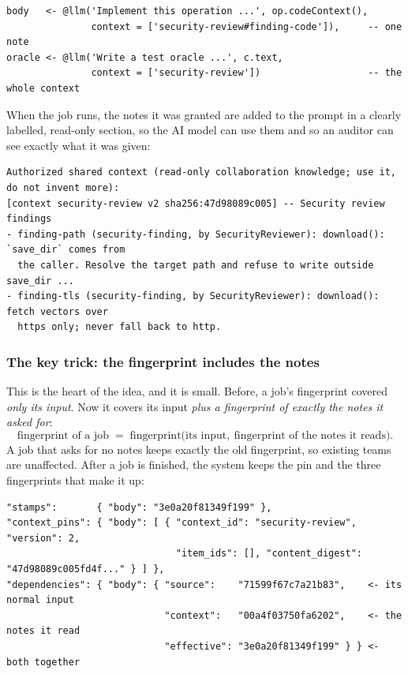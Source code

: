 \documentclass[10pt,a4paper]{article}
\newcommand{\code}[1]{\texttt{#1}}
\begin{document}
\begin{lstlisting}[style=model, caption={Two jobs. The Developer's code job reads one note; the Tester's job reads the whole context. (Real rule variants from the experiment.)}, label={lst:rule}]
body   <- @llm('Implement this operation ...', op.codeContext(),
               context = ['security-review#finding-code']),     -- one note
oracle <- @llm('Write a test oracle ...', c.text,
               context = ['security-review'])                   -- the whole context
\end{lstlisting}

When the job runs, the notes it was granted are added to the prompt in a clearly labelled, read-only section,
so the AI model can use them and so an auditor can see exactly what it was given:

\begin{lstlisting}[style=llm, caption={Part of a real prompt for the Developer's \code{download} job (the end of the prompt).}, label={lst:prompt}]
Authorized shared context (read-only collaboration knowledge; use it, do not invent more):
[context security-review v2 sha256:47d98089c005] -- Security review findings
- finding-path (security-finding, by SecurityReviewer): download(): `save_dir` comes from
  the caller. Resolve the target path and refuse to write outside save_dir ...
- finding-tls (security-finding, by SecurityReviewer): download(): fetch vectors over
  https only; never fall back to http.
\end{lstlisting}

\subsubsection*{The key trick: the fingerprint includes the notes}

This is the heart of the idea, and it is small. Before, a job's fingerprint covered \emph{only its input}. Now it
covers its input \emph{plus a fingerprint of exactly the notes it asked for}:
\[
\text{fingerprint of a job} \;=\; \text{fingerprint}\bigl(\text{its input},\ \text{fingerprint of the notes it reads}\bigr).
\]
A job that asks for no notes keeps exactly the old fingerprint, so existing teams are unaffected. After a job is
finished, the system keeps the pin and the three fingerprints that make it up:

\begin{lstlisting}[style=engine, caption={What the system stores for the finished \code{download} code job (real output). The ``effective'' fingerprint is the one compared later.}, label={lst:trace}]
"stamps":       { "body": "3e0a20f81349f199" },
"context_pins": { "body": [ { "context_id": "security-review", "version": 2,
                              "item_ids": [], "content_digest": "47d98089c005fd4f..." } ] },
"dependencies": { "body": { "source":    "71599f67c7a21b83",    <- its normal input
                            "context":   "00a4f03750fa6202",    <- the notes it read
                            "effective": "3e0a20f81349f199" } } <- both together
\end{lstlisting}
\end{document}
